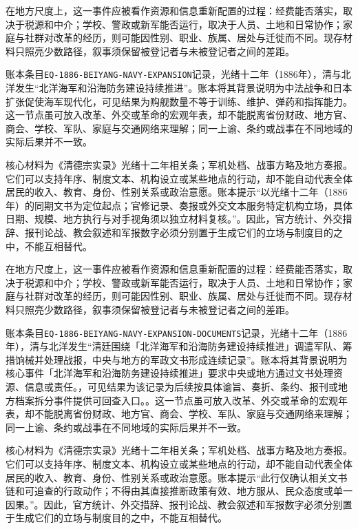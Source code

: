 在地方尺度上，这一事件应被看作资源和信息重新配置的过程：经费能否落实，取决于税源和中介；学校、警政或新军能否运行，取决于人员、土地和日常协作；家庭与社群对改革的经历，则可能因性别、职业、族属、居处与迁徙而不同。现存材料只照亮少数路径，叙事须保留被登记者与未被登记者之间的差距。

账本条目\texttt{EQ-1886-BEIYANG-NAVY-EXPANSION}记录，光绪十二年（1886年），清与北洋发生“北洋海军和沿海防务建设持续推进”。账本将其背景说明为中法战争和日本扩张促使海军现代化，可见结果为购舰数量不等于训练、维护、弹药和指挥能力。这一节点虽可放入改革、外交或革命的宏观年表，却不能脱离省份财政、地方官、商会、学校、军队、家庭与交通网络来理解；同一上谕、条约或战事在不同地域的实际后果并不一致。

核心材料为《清德宗实录》光绪十二年相关条；军机处档、战事方略及地方奏报。它们可以支持年序、制度文本、机构设立或某些地点的行动，却不能自动代表全体居民的收入、教育、身份、性别关系或政治意愿。账本提示“以光绪十二年（1886年）的同期文书为定位起点；官修记录、奏报或外交文本服务特定机构立场，具体日期、规模、地方执行与对手视角须以独立材料复核。”。因此，官方统计、外交措辞、报刊论战、教会叙述和军报数字必须分别置于生成它们的立场与制度目的之中，不能互相替代。

在地方尺度上，这一事件应被看作资源和信息重新配置的过程：经费能否落实，取决于税源和中介；学校、警政或新军能否运行，取决于人员、土地和日常协作；家庭与社群对改革的经历，则可能因性别、职业、族属、居处与迁徙而不同。现存材料只照亮少数路径，叙事须保留被登记者与未被登记者之间的差距。

账本条目\texttt{EQ-1886-BEIYANG-NAVY-EXPANSION-DOCUMENTS}记录，光绪十二年（1886年），清与北洋发生“清廷围绕「北洋海军和沿海防务建设持续推进」调遣军队、筹措饷械并处理战报，中央与地方的军政文书形成连续记录”。账本将其背景说明为核心事件「北洋海军和沿海防务建设持续推进」要求中央或地方通过文书处理资源、信息或责任。，可见结果为该记录为后续按具体谕旨、奏折、条约、报刊或地方档案拆分事件提供可回查入口。。这一节点虽可放入改革、外交或革命的宏观年表，却不能脱离省份财政、地方官、商会、学校、军队、家庭与交通网络来理解；同一上谕、条约或战事在不同地域的实际后果并不一致。

核心材料为《清德宗实录》光绪十二年相关条；军机处档、战事方略及地方奏报。它们可以支持年序、制度文本、机构设立或某些地点的行动，却不能自动代表全体居民的收入、教育、身份、性别关系或政治意愿。账本提示“此行仅确认相关文书链和可追查的行政动作；不得由其直接推断政策有效、地方服从、民众态度或单一因果。”。因此，官方统计、外交措辞、报刊论战、教会叙述和军报数字必须分别置于生成它们的立场与制度目的之中，不能互相替代。

